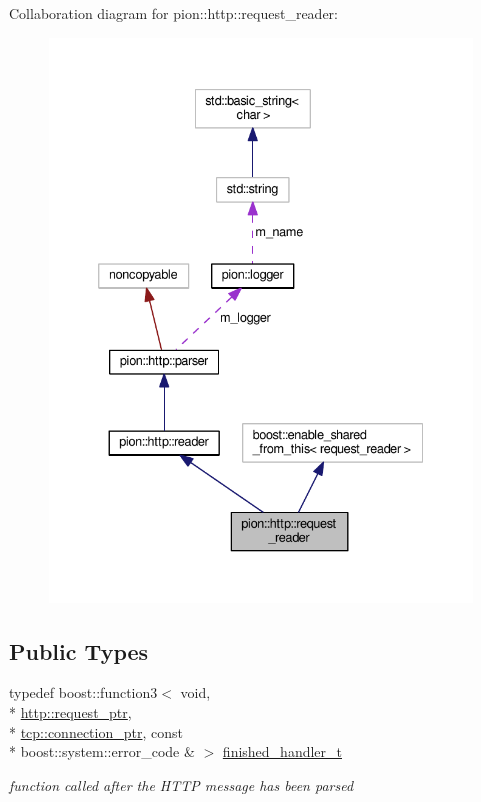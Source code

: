 Collaboration diagram for pion\-:\-:http\-:\-:request\-\_\-reader\-:
\nopagebreak
\begin{figure}[H]
\begin{center}
\leavevmode
\includegraphics[width=335pt]{classpion_1_1http_1_1request__reader__coll__graph}
\end{center}
\end{figure}
\subsection*{Public Types}
\begin{DoxyCompactItemize}
\item 
typedef boost\-::function3$<$ void, \\*
\hyperlink{namespacepion_1_1http_ace432b70a9459d50ff4969a7a47f0ccb}{http\-::request\-\_\-ptr}, \\*
\hyperlink{namespacepion_1_1tcp_a6c9b7497068009f6d81d95ec0b0627d6}{tcp\-::connection\-\_\-ptr}, const \\*
boost\-::system\-::error\-\_\-code \& $>$ \hyperlink{classpion_1_1http_1_1request__reader_a4cc323f3e852134f2ac785e51e1d623e}{finished\-\_\-handler\-\_\-t}
\begin{DoxyCompactList}\small\item\em function called after the H\-T\-T\-P message has been parsed \end{DoxyCompactList}\end{DoxyCompactItemize}

